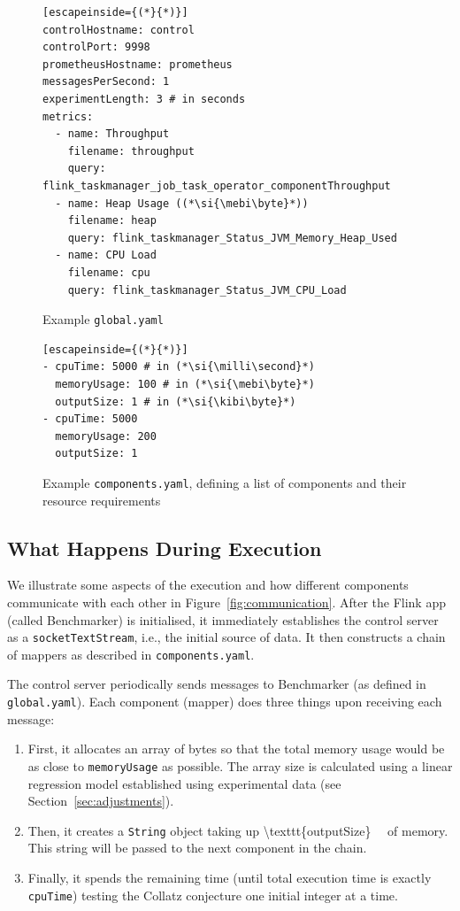 \documentclass{article}
\begin{document}
\begin{figure}
  \centering
\begin{lstlisting}[escapeinside={(*}{*)}]
controlHostname: control
controlPort: 9998
prometheusHostname: prometheus
messagesPerSecond: 1
experimentLength: 3 # in seconds
metrics:
  - name: Throughput
    filename: throughput
    query: flink_taskmanager_job_task_operator_componentThroughput
  - name: Heap Usage ((*\si{\mebi\byte}*))
    filename: heap
    query: flink_taskmanager_Status_JVM_Memory_Heap_Used
  - name: CPU Load
    filename: cpu
    query: flink_taskmanager_Status_JVM_CPU_Load
\end{lstlisting}
  \caption{Example \texttt{global.yaml}}
  \label{fig:global}
\end{figure}

\begin{figure}
  \centering
\begin{lstlisting}[escapeinside={(*}{*)}]
- cpuTime: 5000 # in (*\si{\milli\second}*)
  memoryUsage: 100 # in (*\si{\mebi\byte}*)
  outputSize: 1 # in (*\si{\kibi\byte}*)
- cpuTime: 5000
  memoryUsage: 200
  outputSize: 1
\end{lstlisting}
  \caption{Example \texttt{components.yaml}, defining a list of components and
    their resource requirements}
  \label{fig:components}
\end{figure}

\subsection{What Happens During Execution} \label{sec:execution}

We illustrate some aspects of the execution and how different components
communicate with each other in Figure~\ref{fig:communication}. After the Flink
app (called Benchmarker) is initialised, it immediately establishes the control
server as a \texttt{socketTextStream}, i.e., the initial source of data. It then
constructs a chain of mappers as described in \texttt{components.yaml}.

The control server periodically sends messages to Benchmarker (as defined in
\texttt{global.yaml}). Each component (mapper) does three things upon receiving
each message:
\begin{enumerate}
\item First, it allocates an array of bytes so that the total memory usage would
  be as close to \texttt{memoryUsage} as possible. The array size is calculated
  using a linear regression model established using experimental data (see
  Section~\ref{sec:adjustments}).
\item Then, it creates a \texttt{String} object taking up \SI[number-math-rm =
  \mathnormal, parse-numbers = false]{\texttt{outputSize}}{\kibi\byte} of
  memory. This string will be passed to the next component in the chain.
\item Finally, it spends the remaining time (until total execution time is
  exactly \texttt{cpuTime}) testing the Collatz conjecture \cite{collatz} one
  initial integer at a time.
\end{enumerate}
\end{document}
